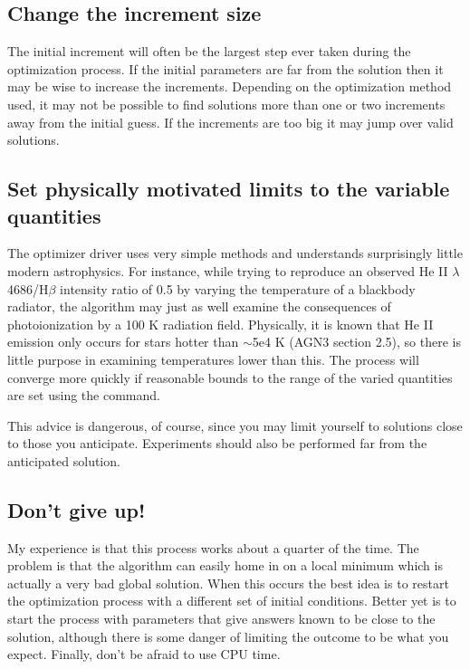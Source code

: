 \subsection{Change the increment size}

The initial increment will often be the largest step ever taken during
the optimization process.
If the initial parameters are far from the
solution then it may be wise to increase the increments.
Depending on the
optimization method used, it may not be possible to find solutions more
than one or two increments away from the initial guess.
If the increments
are too big it may jump over valid solutions.

\subsection{Set physically motivated limits to the variable quantities}

The optimizer driver uses very simple methods and understands surprisingly
little modern astrophysics.
For instance, while trying to reproduce an
observed He II $\lambda$4686/H$\beta$ intensity ratio of 0.5 by varying the temperature
of a blackbody radiator, the algorithm may just as well examine the consequences
of photoionization by a 100 K radiation field.
Physically, it is known
that He II emission only occurs for stars hotter than
$\sim$5e4 K (AGN3 section 2.5), so there is little purpose
in examining temperatures lower than this.
The process will converge more quickly if
reasonable bounds to the range
of the varied quantities are set using
the  command.

This advice is dangerous, of course, since you may limit yourself to
solutions close to those you anticipate.
Experiments should also be
performed far from the anticipated solution.

\subsection{Don't give up!}

My experience is that this process works about a quarter of the time.
The problem is that the algorithm can easily home in on a local minimum
which is actually a very bad global solution.
When this occurs the best
idea is to restart the optimization process with a different
set of initial conditions.
Better yet is to start the process with parameters that give
answers known to be close to the solution,
although there is some danger
of limiting the outcome to be what you expect.
Finally, don't be afraid
to use CPU time.

